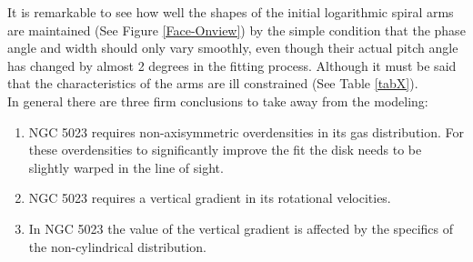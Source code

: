 \documentclass[useAMS,usenatbib]{mn2e}
\begin{document}
\indent It is remarkable to see how well the shapes of the initial logarithmic spiral arms are maintained (See Figure \ref{Face-Onview}) by the simple condition that the phase angle and width should only vary smoothly, even though their actual pitch angle has changed by almost 2 degrees in the fitting process. Although it must be said that the characteristics of the arms are ill constrained (See Table \ref{tabX}).\\
\indent In general there are three firm conclusions to take away from the modeling:
\begin{enumerate}
\item NGC 5023 requires non-axisymmetric overdensities in its gas distribution. For these overdensities to significantly improve the fit the disk needs to be slightly warped in the line of sight.
\item NGC 5023 requires a vertical gradient in its rotational velocities.
\item In NGC 5023 the value of the vertical gradient is affected by the specifics of the non-cylindrical distribution.
\end{enumerate}
\end{document}

